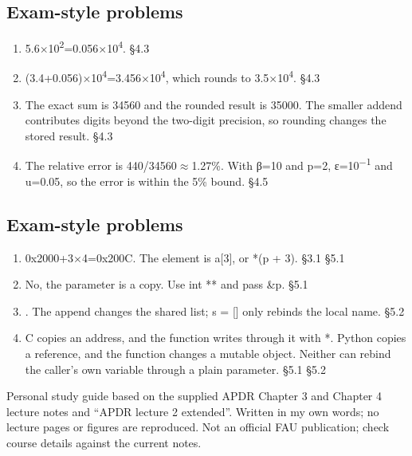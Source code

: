 \documentclass[11pt]{article}
\begin{document}
\begin{keepsection}\subsection{Exam-style problems}

\begin{enumerate}
\item 5.6\ensuremath{\times}10\textsuperscript{2}=0.056\ensuremath{\times}10\textsuperscript{4}. \hfill{\small\color{FAUblue}§4.3}
\item (3.4+0.056)\ensuremath{\times}10\textsuperscript{4}=3.456\ensuremath{\times}10\textsuperscript{4}, which rounds to 3.5\ensuremath{\times}10\textsuperscript{4}. \hfill{\small\color{FAUblue}§4.3}
\item The exact sum is 34560 and the rounded result is 35000. The smaller addend contributes digits beyond the two-digit precision, so rounding changes the stored result. \hfill{\small\color{FAUblue}§4.3}
\item The relative error is 440/34560\ensuremath{\approx}1.27\%. With β=10 and p=2, ε=10\textsuperscript{\ensuremath{-}1} and u=0.05, so the error is within the 5\% bound. \hfill{\small\color{FAUblue}§4.5}
\end{enumerate}

\end{keepsection}
\begin{keepsection}\subsection{Exam-style problems}

\begin{enumerate}
\item 0x2000+3\ensuremath{\times}4=0x200C. The element is a[3], or *(p + 3). \hfill{\small\color{FAUblue}§3.1} \hfill{\small\color{FAUblue}§5.1}
\item No, the parameter is a copy. Use int ** and pass \&p. \hfill{\small\color{FAUblue}§5.1}
\item [0, 1]. The append changes the shared list; s = [] only rebinds the local name. \hfill{\small\color{FAUblue}§5.2}
\item C copies an address, and the function writes through it with *. Python copies a reference, and the function changes a mutable object. Neither can rebind the caller’s own variable through a plain parameter. \hfill{\small\color{FAUblue}§5.1} \hfill{\small\color{FAUblue}§5.2}
\end{enumerate}

\end{keepsection}

\vfill{\small Personal study guide based on the supplied APDR Chapter 3 and Chapter 4 lecture notes and “APDR lecture 2 extended”. Written in my own words; no lecture pages or figures are reproduced. Not an official FAU publication; check course details against the current notes.}
\end{document}
